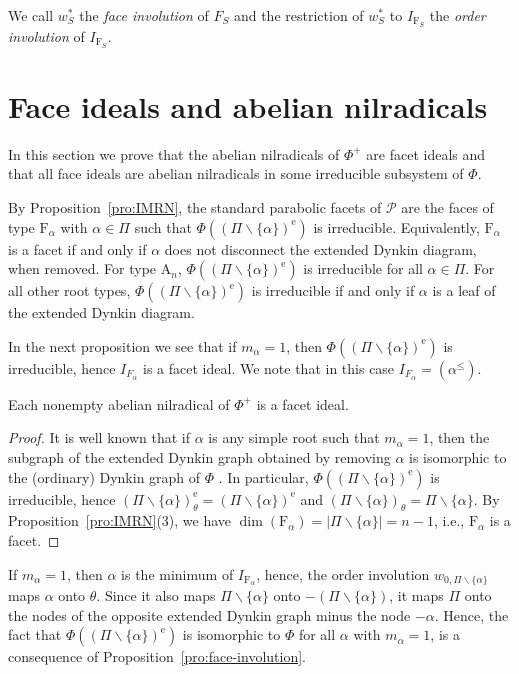 \documentclass[ALCO,published]{cedram}
\newcommand\pol{\mathcal P}
\theoremstyle{plain}
\newcommand\smeno{\smallsetminus}
\newcommand\pol{\mathcal P}
\newcommand\al{\alpha}
\newcommand\erm{{\mathrm{e}}}
\renewcommand{\leq}{\leqslant}
\begin{document}
\begin{defi}
We call $w^*_S$ the {\it face involution} of $F_S$ and the restriction of $w^*_S$
to $I_{\mathrm F_S}$ the {\it order involution} of  $I_{\mathrm F_S}$. 
\end{defi}

\section{Face ideals and abelian nilradicals}\label{sec:face-ideals}

In this section we prove that the abelian nilradicals of $\Phi^+$ are facet ideals and that all face ideals are abelian nilradicals in some irreducible subsystem of $\Phi$.  
\par

By Proposition~\ref{pro:IMRN}, the standard parabolic facets of $\pol$ are the faces of type $\mathrm F_{\al}$ with $\al\in \Pi$ such that  $\Phi((\Pi\smeno\{\al\})^\erm)$ is irreducible.
Equivalently, $\mathrm F_\al$ is a facet if and only if $\al$ does not disconnect the extended Dynkin diagram, when removed.
For type $\mathrm A_n$, $\Phi((\Pi\smeno \{\al\})^\erm)$ is irreducible for all $\al\in \Pi$.
For all other root types, $\Phi((\Pi\smeno \{\al\})^\erm)$ is irreducible if and only if  $\al$ is a leaf of the extended Dynkin diagram.
\par

In the next proposition we see that if $m_\al=1$, then  $\Phi((\Pi\smeno\{\al\})^\erm)$ is irreducible, hence $I_{F_\al}$ is a facet ideal. 
We note that in this case  $I_{F_\al}=(\al^\leq)$.

\begin{pro}\label{pro:abnil-are-facets}
Each nonempty abelian nilradical of $\Phi^+$ is a facet ideal.
\end{pro}

\begin{proof}
It is well known that if $\al$ is any simple root such that $m_\al=1$,  then the subgraph of the extended Dynkin graph obtained by removing $\al$ is isomorphic to the (ordinary) Dynkin graph of $\Phi$ \cite{IM}. 
In particular, $\Phi((\Pi\smeno \{\al\})^\erm)$ is irreducible, hence $(\Pi\smeno \{\al\})^\erm_\theta=(\Pi\smeno \{\al\})^\erm$ and $(\Pi\smeno \{\al\})_\theta=\Pi\smeno \{\al\}$. 
By Proposition~\ref{pro:IMRN}(3), we have $\dim(\mathrm F_\al)=|\Pi\smeno \{\al\}|=n-1$, i.e., $\mathrm F_\al$ is a facet. 
\end{proof}

If $m_\al=1$, then $\al$ is the minimum of $I_{\mathrm F_\al}$, hence, the order involution $w_{0,\Pi\smeno\{\al\}}$ maps $\al$ onto $\theta$. 
Since it also maps $\Pi\smeno\{\al\}$ onto  $-(\Pi\smeno\{\al\})$, it maps $\Pi$ onto the nodes of the opposite extended Dynkin graph minus the node $-\al$. 
Hence, the fact that $\Phi((\Pi\smeno \{\al\})^\erm)$ is isomorphic to $\Phi$ for all $\al$ with $m_\al=1$, is a consequence of Proposition~\ref{pro:face-involution}.
\end{document}
